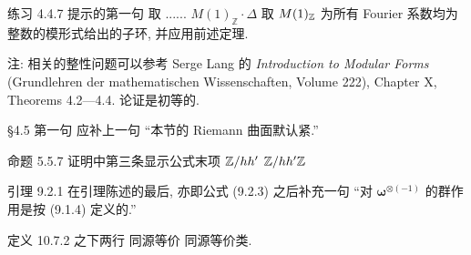 \documentclass{AJerrata}
\begin{document}
\begin{Errata}
		\item[练习 4.4.7 提示的第一句]
		\Orig 取 ...... $M(1)_{\mathbb{Z}} \cdot \Delta$
		\Corr 取 $M(1)_{\mathbb{Z}}$ 为所有 Fourier 系数均为整数的模形式给出的子环, 并应用前述定理.
		
		注: 相关的整性问题可以参考 Serge Lang 的 \textit{Introduction to Modular Forms} (Grundlehren der mathematischen Wissenschaften, Volume 222), Chapter X, Theorems 4.2---4.4. 论证是初等的.
		
		\item[\S 4.5 第一句]
		应补上一句 ``本节的 Riemann 曲面默认紧.''
		
		\item[命题 5.5.7 证明中第三条显示公式末项]
		\Orig $\mathbb{Z}/hh'$
		\Corr $\mathbb{Z}/hh' \mathbb{Z}$
		
		\item[引理 9.2.1]
		在引理陈述的最后, 亦即公式 (9.2.3) 之后补充一句 ``对 $\symbf{\omega}^{\otimes (-1)}$ 的群作用是按 (9.1.4) 定义的.''
		
		\item[定义 10.7.2 之下两行]
		\Orig 同源等价
		\Corr 同源等价类.
	\end{Errata}
\end{document}
